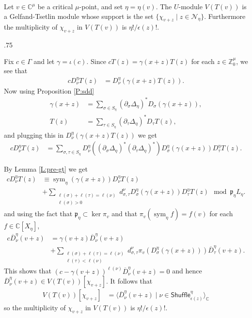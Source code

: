 \documentclass[11pt,fleqn]{article}
\makeatletter
\renewenvironment{proof}[1][\textit{Proof}]{\par
  \pushQED{\qed}%
  \normalfont \topsep.75\paraskip\relax
  \trivlist
  \item[\hskip\labelsep
        \itshape
    #1\@addpunct{.}]\ignorespaces
}{%
  \popQED\endtrivlist\@endpefalse
}
\newcommand\CC{\mathbb C}
\newcommand\ZZ{\mathbb Z}
\newcommand\D{\overline D}
\newcommand\N{\mathcal N}
\newcommand\p{\mathfrak p}
\newcommand\Shuffle{\mathsf{Shuffle}}
\DeclareMathOperator\sym{sym}
\makeatother
\begin{document}
\begin{Theorem}
\label{T:gt-module}
Let $v \in \CC^\mu$ be a critical $\mu$-point, and set $\eta = \eta(v)$. The 
$U$-module $V(T(v))$ is a Gelfand-Tsetlin module whose support is the set 
$\{\chi_{v+z} \mid z \in \N_\eta\}$. Furthermore the multiplicity of 
$\chi_{v+z}$ in $V(T(v))$ is $\eta!/\epsilon(z)!$.
\end{Theorem}
\begin{proof}
Fix $c \in \Gamma$ and let $\gamma = \iota(c)$. Since $c T(z) = \gamma(x+z) 
T(z)$ for each $z \in \ZZ^\mu_0$, we see that
\begin{align*}
c D_\nu^\eta T(z)
  &= D_\nu^\eta( \gamma(x+z) T(z)).
\end{align*}
Now using Proposition \ref{P:sdd}
\begin{align*}
\gamma(x+z) 
  &= \sum_{\sigma \in S_\eta} (\partial_{\sigma} \Delta_\eta)^*
    D_\sigma(\gamma(x+z)) , \\
T(z)
  &= \sum_{\tau \in S_\eta} (\partial_{\tau} \Delta_\eta)^* 
    D_\tau T(z),
\end{align*}
and plugging this in $D_\nu^\eta( \gamma(x+z) T(z))$ we get
\begin{align*}
c D_\nu^\eta T(z)
  &= \sum_{\sigma,\tau \in S_\eta} D_{\nu}^\eta(
  (\partial_{\sigma} \Delta_\eta)^* (\partial_{\tau} \Delta_\eta)^* )
  D_\sigma^\eta(\gamma(x+z)) D_\tau^\eta T(z).
\end{align*}

By Lemma \ref{L:pre-gt} we get
\begin{align*}
c D_\nu^\eta T(z)
  &\equiv \sym_\eta(\gamma(x+z)) D_\nu^\eta T(z) \\
  &+ \sum_{\substack{\ell(\sigma) + \ell(\tau) = \ell(\nu) \\ \ell(\sigma)>0}} 
    d^\nu_{\sigma, \tau} D_\sigma^\eta(\gamma(x+z)) D_\tau^\eta T(z) 
        \mod \p_\eta L_\eta.
\end{align*}
and using the fact that $\p_\eta \subset \ker \pi_v$ and that $\pi_v(\sym_\eta
f) = f(v)$ for each $f \in \CC[X_\eta]$, 
\begin{align*}
c \D_\nu^\eta (v+z)
  &= \gamma(v+z) \D_\nu^\eta (v+z) \\
  &+ \sum_{\substack{\ell(\sigma) + \ell(\tau) = \ell(\nu) \\ 
      \ell(\tau)<\ell(\nu)}} 
    d^\nu_{\sigma, \tau} \pi_v(D_\sigma^\eta(\gamma(x+z))) \D_\tau^\eta (v+z).
\end{align*}
This shows that $(c-\gamma(v+z))^{\ell(\nu)} \D_\nu^\eta(v+z) = 0$ and hence
$\D_\nu^\eta(v+z) \in V(T(v))[\chi_{v+z}]$. It follows that
\begin{align*}
V(T(v))[\chi_{v+z}]
  &= \langle \D_\nu^\eta(v+z) \mid \nu \in \Shuffle_{\epsilon(z)}^\eta
    \rangle_\CC
\end{align*}
so the multiplicity of $\chi_{v+z}$ in $V(T(v))$ is $\eta!/\epsilon(z)!$.
\end{proof}
\end{document}
